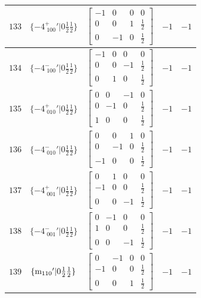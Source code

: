 \documentclass[fleqn,8pt]{jsarticle}
\begin{document}
\begin{longtable}{ccccc}
$ 133 $ & $ \{-4^{+}_{\,\,100}{}'|0 \frac{1}{2} \frac{1}{2}\} $ & $ \begin{bmatrix} -1 & 0 & 0 & 0 \\ 0 & 0 & 1 & \frac{1}{2} \\ 0 & -1 & 0 & \frac{1}{2} \end{bmatrix} $ & $ -1 $ & $ -1 $ \\ \hline
$ 134 $ & $ \{-4^{-}_{\,\,100}{}'|0 \frac{1}{2} \frac{1}{2}\} $ & $ \begin{bmatrix} -1 & 0 & 0 & 0 \\ 0 & 0 & -1 & \frac{1}{2} \\ 0 & 1 & 0 & \frac{1}{2} \end{bmatrix} $ & $ -1 $ & $ -1 $ \\ \hline
$ 135 $ & $ \{-4^{+}_{\,\,010}{}'|0 \frac{1}{2} \frac{1}{2}\} $ & $ \begin{bmatrix} 0 & 0 & -1 & 0 \\ 0 & -1 & 0 & \frac{1}{2} \\ 1 & 0 & 0 & \frac{1}{2} \end{bmatrix} $ & $ -1 $ & $ -1 $ \\ \hline
$ 136 $ & $ \{-4^{-}_{\,\,010}{}'|0 \frac{1}{2} \frac{1}{2}\} $ & $ \begin{bmatrix} 0 & 0 & 1 & 0 \\ 0 & -1 & 0 & \frac{1}{2} \\ -1 & 0 & 0 & \frac{1}{2} \end{bmatrix} $ & $ -1 $ & $ -1 $ \\ \hline
$ 137 $ & $ \{-4^{+}_{\,\,001}{}'|0 \frac{1}{2} \frac{1}{2}\} $ & $ \begin{bmatrix} 0 & 1 & 0 & 0 \\ -1 & 0 & 0 & \frac{1}{2} \\ 0 & 0 & -1 & \frac{1}{2} \end{bmatrix} $ & $ -1 $ & $ -1 $ \\ \hline
$ 138 $ & $ \{-4^{-}_{\,\,001}{}'|0 \frac{1}{2} \frac{1}{2}\} $ & $ \begin{bmatrix} 0 & -1 & 0 & 0 \\ 1 & 0 & 0 & \frac{1}{2} \\ 0 & 0 & -1 & \frac{1}{2} \end{bmatrix} $ & $ -1 $ & $ -1 $ \\ \hline
$ 139 $ & $ \{{\rm m}_{110}{}'|0 \frac{1}{2} \frac{1}{2}\} $ & $ \begin{bmatrix} 0 & -1 & 0 & 0 \\ -1 & 0 & 0 & \frac{1}{2} \\ 0 & 0 & 1 & \frac{1}{2} \end{bmatrix} $ & $ -1 $ & $ -1 $ \\ \hline

\end{longtable}
\end{document}
